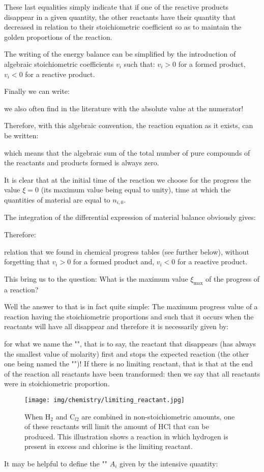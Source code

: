 	These last equalities simply indicate that if one of the reactive products disappear in a given quantity, the other reactants have their quantity that decreased in relation to their stoichiometric coefficient so as to maintain the golden proportions of the reaction.
	
		The writing of the energy balance can be simplified by the introduction of algebraic stoichiometric coefficients $v_i$ such that: $v_i>0$ for a formed product, $v_i<0$ for a reactive product.

	Finally we can write:
	
	we also often find in the literature with the absolute value at the numerator!

	Therefore, with this algebraic convention, the reaction equation as it exists, can be written:
	
	which means that the algebraic sum of the total number of pure compounds of the reactants and products formed is always zero.

	It is clear that at the initial time of the reaction we choose for the progress the value $\xi=0$ (its maximum value being equal to unity), time at which the quantities of material are equal to $n_{i,0}$.

	The integration of the differential expression of material balance obviously gives:
	
	Therefore:
	
	relation that we found in chemical progress tables (see further below), without forgetting that $v_i>0$ for a formed product and, $v_i<0$ for a reactive product.

	This bring us to the question: What is the maximum value $\xi_{\max}$ of the progress of a reaction? 

	Well the answer to that is in fact quite simple: The maximum progress value of a reaction having the stoichiometric proportions and such that it occurs when the reactants will have all disappear and therefore it is necessarily given by:
	
	for what we name the "", that is to say, the reactant that disappears (has always the smallest value of molarity) first and stops the expected reaction (the other one being named the "")! If there is no limiting reactant, that is that at the end of the reaction all reactants have been transformed: then we say that all reactants were in stoichiometric proportion.
	\begin{figure}[H]
		\centering
		\texttt{[image: img/chemistry/limiting\_reactant.jpg]}
		\caption[Limiting reactant illustration]{When $\mathrm{H}_2$ and $\mathrm{C}_{l2}$ are combined in non-stoichiometric amounts, one of these reactants will limit the amount of $\mathrm{HCl}$ that can be produced. This illustration shows a reaction in which hydrogen is present in excess and chlorine is the limiting reactant.}
	\end{figure}
	It may be helpful to define the "" $A_i$ given by the intensive quantity:
	
